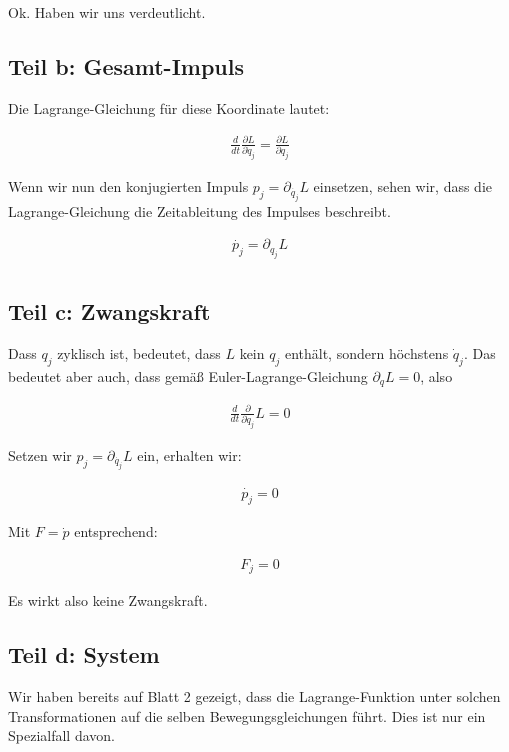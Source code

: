 \documentclass[a4paper,german,12pt,smallheadings]{scrartcl}
\begin{document}
Ok. Haben wir uns verdeutlicht.

\subsection*{Teil b: Gesamt-Impuls}

Die Lagrange-Gleichung für diese Koordinate lautet:

\begin{align*}
  \frac{d}{dt}\frac{\partial L}{\partial \dot{q}_j} = \frac{\partial L}{\partial q_j}
\end{align*}


Wenn wir nun den konjugierten Impuls $p_j = \partial_{\dot{q_j}} L$ einsetzen, sehen
wir, dass die Lagrange-Gleichung die Zeitableitung des Impulses beschreibt.

\begin{align*}
  \dot{p_j} = \partial_{q_j} L\\
\end{align*}
\subsection*{Teil c: Zwangskraft}

Dass $q_j$ zyklisch ist, bedeutet, dass $L$ kein $q_j$ enthält, sondern
höchstens $\dot{q}_j$. Das bedeutet aber auch, dass gemäß
Euler-Lagrange-Gleichung $\partial_q L = 0$, also

\begin{align*}
  \frac{d}{dt} \frac{\partial}{\partial \dot{q}_j} L = 0
\end{align*}

Setzen wir $p_j = \partial_{\dot{q_j}} L$ ein, erhalten wir:

\begin{align*}
  \dot{p_j} = 0
\end{align*}

Mit $F = \dot{p}$ entsprechend:

\begin{align*}
  F_j = 0
\end{align*}

Es wirkt also keine Zwangskraft.

\subsection*{Teil d: System}
Wir haben bereits auf Blatt 2 gezeigt, dass die Lagrange-Funktion unter solchen
Transformationen auf die selben Bewegungsgleichungen führt. Dies ist nur ein
Spezialfall davon.
\end{document}
